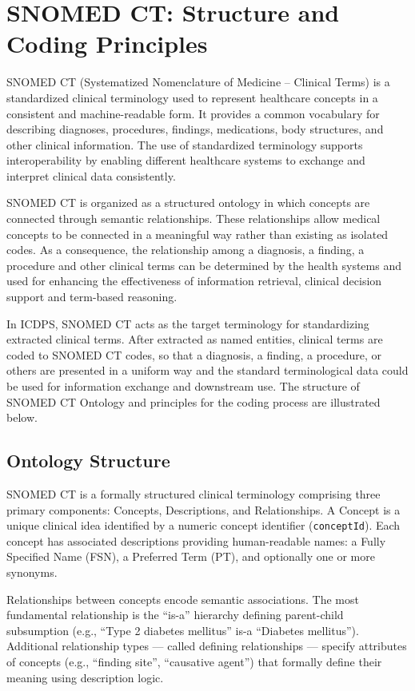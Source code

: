 \section{SNOMED CT: Structure and Coding Principles}

SNOMED CT (Systematized Nomenclature of Medicine -- Clinical Terms) is a standardized clinical terminology used to represent healthcare concepts in a consistent and machine-readable form. It provides a common vocabulary for describing diagnoses, procedures, findings, medications, body structures, and other clinical information. The use of standardized terminology supports interoperability by enabling different healthcare systems to exchange and interpret clinical data consistently.

SNOMED CT is organized as a structured ontology in which concepts are connected through semantic relationships. These relationships allow medical concepts to be connected in a meaningful way rather than existing as isolated codes. As a consequence, the relationship among a diagnosis, a finding, a procedure and other clinical terms can be determined by the health systems and used for enhancing the effectiveness of information retrieval, clinical decision support and term-based reasoning.

In ICDPS, SNOMED CT acts as the target terminology for standardizing extracted clinical terms. After extracted as named entities, clinical terms are coded to SNOMED CT codes, so that a diagnosis, a finding, a procedure, or others are presented in a uniform way and the standard terminological data could be used for information exchange and downstream use. The structure of SNOMED CT Ontology and principles for the coding process are illustrated below.

\subsection{Ontology Structure}
SNOMED CT is a formally structured clinical terminology comprising three primary components: Concepts, Descriptions, and Relationships. A Concept is a unique clinical idea identified by a numeric concept identifier (\texttt{conceptId}). Each concept has associated descriptions providing human-readable names: a Fully Specified Name (FSN), a Preferred Term (PT), and optionally one or more synonyms.

Relationships between concepts encode semantic associations. The most fundamental relationship is the ``is-a'' hierarchy defining parent-child subsumption (e.g., ``Type 2 diabetes mellitus'' is-a ``Diabetes mellitus''). Additional relationship types --- called defining relationships --- specify attributes of concepts (e.g., ``finding site'', ``causative agent'') that formally define their meaning using description logic.

